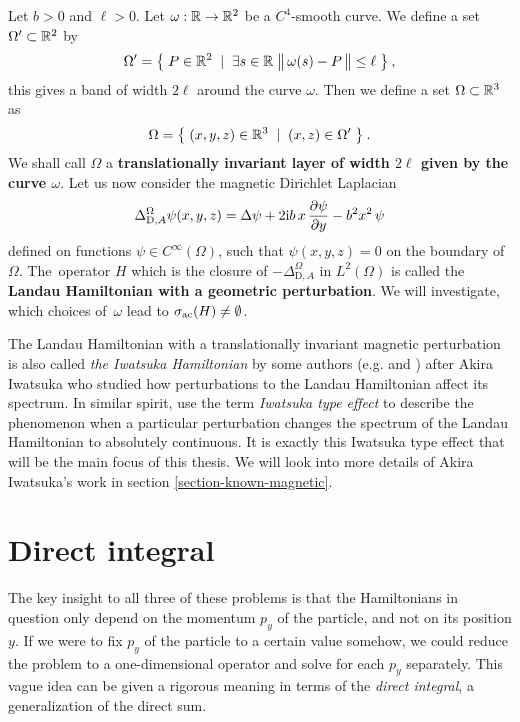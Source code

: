 \begin{defn}
    \label{defn-perturb-geom}
    Let $b>0$ and $\ell > 0$. Let $\omega: \mathbb{R} \to \mathbb{R}^2$ be a $C^4$-smooth curve. We define a set $\Omega' \subset \mathbb{R}^2$ by
    \begin{equation*}
        \Omega' = \big\{\;
            P \in \mathbb{R}^2
        \;\;|\;\;
            \exists s \in \mathbb{R} \;
            \big\lVert  \, \omega(s) - P \,  \big\rVert \leq \ell
        \;\big\}
        \: ,
    \end{equation*}
    this gives a band of width $2\ell$ around the curve $\omega$. \!Then we define a set $\Omega \subset \mathbb{R}^3$ as
    \begin{equation*}
        \Omega = \big\{\;
            (x, y, z) \in \mathbb{R}^3
        \;\;|\;\;
            (x, z) \in \Omega'
        \;\big\} \: .
    \end{equation*}
    We shall call $\Omega$ a \textbf{translationally invariant layer of width $2\ell$ given by the curve $\omega$}. Let us now consider the magnetic Dirichlet Laplacian
    \begin{align*}
        \Delta^\Omega_{\mathrm{D}, A} \psi(x,y,z)
        = \Delta \psi + 2\mathrm{i} b \, x \, \frac{\partial \psi}{\partial y} - b^2 x^2 \, \psi
    \end{align*}
    defined on functions $\psi \in C^\infty(\Omega)$, such that $\psi(x,y,z) = 0$ on the boundary of $\Omega$. The~operator $H$ which is the closure of $-\Delta^\Omega_{\mathrm{D}, A}$ in $L^2(\Omega)$ is called the \textbf{Landau Hamiltonian with a geometric perturbation}. We will investigate, which choices of~$\omega$ lead to $\sigma_{\mathrm{ac}}(H) \neq \emptyset$.
\end{defn}

The Landau Hamiltonian with a translationally invariant magnetic perturbation is also called \textit{the Iwatsuka Hamiltonian} by some authors (e.g. \cite{Miranda2017} and \cite{Hislop2015}) after Akira Iwatsuka who studied how perturbations to the Landau Hamiltonian affect its spectrum. In similar spirit, \cite{Exner2018} use the term \textit{Iwatsuka type effect} to describe the phenomenon when a particular perturbation changes the spectrum of the Landau Hamiltonian to absolutely continuous. It is exactly this Iwatsuka type effect that will be the main focus of this thesis. We will look into more details of Akira Iwatsuka's work in section \ref{section-known-magnetic}.



\section{Direct integral}
The key insight to all three of these problems is that the Hamiltonians in question only depend on the momentum $p_y$ of the particle, and not on its position $y$. If we were to fix $p_y$ of the particle to a certain value somehow, we could reduce the problem to a one-dimensional operator and solve for each $p_y$ separately. This vague idea can be given a rigorous meaning in terms of the \textit{direct integral}, a generalization of the direct sum.

